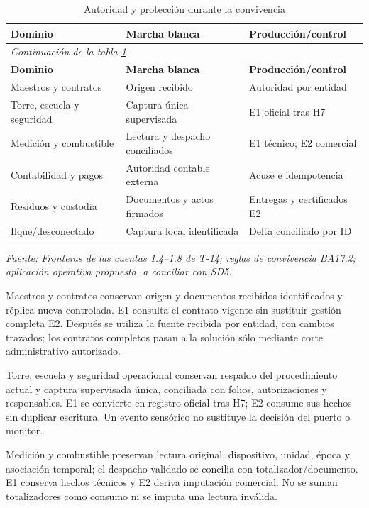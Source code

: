 \begingroup\small\setlength{\tabcolsep}{3pt}
\begin{longtable}{p{}p{}p{}}
\caption{Autoridad y protección durante la convivencia}\label{tab:t18-autoridad}\\\hline
\textbf{Dominio} & \textbf{Marcha blanca} & \textbf{Producción/control}\\\hline\endfirsthead
\multicolumn{3}{l}{\textit{Continuación de la tabla \ref{tab:t18-autoridad}}}\\\hline
\textbf{Dominio} & \textbf{Marcha blanca} & \textbf{Producción/control}\\\hline\endhead
\hline\endfoot\hline\endlastfoot
Maestros y contratos & Origen recibido & Autoridad por entidad\\\hline
Torre, escuela y seguridad & Captura única supervisada & E1 oficial tras H7\\\hline
Medición y combustible & Lectura y despacho conciliados & E1 técnico; E2 comercial\\\hline
Contabilidad y pagos & Autoridad contable externa & Acuse e idempotencia\\\hline
Residuos y custodia & Documentos y actos firmados & Entregas y certificados E2\\\hline
Ilque/desconectado & Captura local identificada & Delta conciliado por ID\\\hline
\end{longtable}\endgroup
\noindent\textit{Fuente: Fronteras de las cuentas 1.4--1.8 de T-14; reglas de convivencia BA17.2; aplicación operativa propuesta, a conciliar con SD5.}

Maestros y contratos conservan origen y documentos recibidos identificados y réplica nueva controlada. E1 consulta el contrato vigente sin sustituir gestión completa E2. Después se utiliza la fuente recibida por entidad, con cambios trazados; los contratos completos pasan a la solución sólo mediante corte administrativo autorizado.

Torre, escuela y seguridad operacional conservan respaldo del procedimiento actual y captura supervisada única, conciliada con folios, autorizaciones y responsables. E1 se convierte en registro oficial tras H7; E2 consume sus hechos sin duplicar escritura. Un evento sensórico no sustituye la decisión del puerto o monitor.

Medición y combustible preservan lectura original, dispositivo, unidad, época y asociación temporal; el despacho validado se concilia con totalizador/documento. E1 conserva hechos técnicos y E2 deriva imputación comercial. No se suman totalizadores como consumo ni se imputa una lectura inválida.

